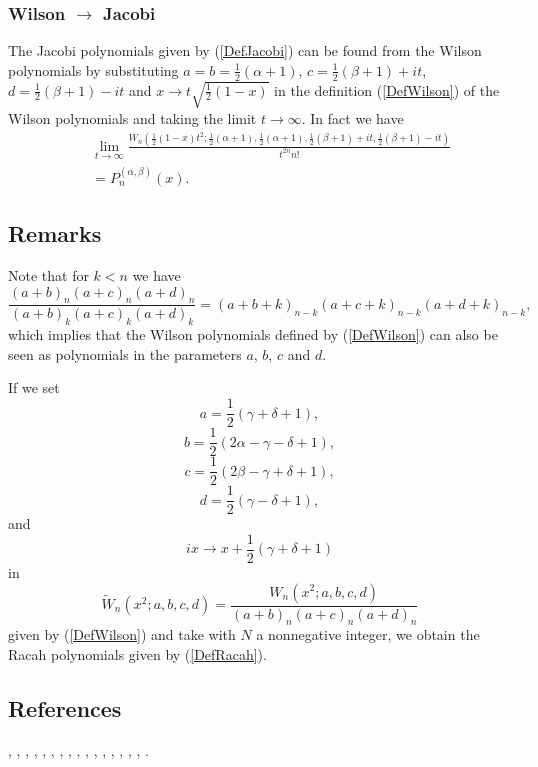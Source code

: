 \documentclass[envcountchap,graybox]{svmono}
\newcounter{rom}
\begin{document}
\subsubsection*{Wilson $\rightarrow$ Jacobi}
The Jacobi polynomials given by (\ref{DefJacobi}) can be found from the Wilson
polynomials by substituting $a=b=\frac{1}{2}(\alpha+1)$, $c=\frac{1}{2}(\beta+1)+it$,
$d=\frac{1}{2}(\beta+1)-it$ and $x\rightarrow t\sqrt{\frac{1}{2}(1-x)}$ in the
definition (\ref{DefWilson}) of the Wilson polynomials and taking the limit
$t\rightarrow\infty$. In fact we have
\begin{eqnarray}
& &\lim_{t\rightarrow\infty}\frac{W_n(\frac{1}{2}(1-x)t^2;\frac{1}{2}(\alpha+1),
\frac{1}{2}(\alpha+1),\frac{1}{2}(\beta+1)+it,\frac{1}{2}(\beta+1)-it)}{t^{2n}n!}\nonumber\\
& &{}=P_n^{(\alpha,\beta)}(x).
\end{eqnarray}

\subsection*{Remarks}
Note that for $k<n$ we have
$$\frac{(a+b)_n(a+c)_n(a+d)_n}{(a+b)_k(a+c)_k(a+d)_k}=(a+b+k)_{n-k}(a+c+k)_{n-k}(a+d+k)_{n-k},$$
which implies that the Wilson polynomials defined by (\ref{DefWilson}) can also be
seen as polynomials in the parameters $a$, $b$, $c$ and $d$.

\noindent
If we set
$$a=\textstyle\frac{1}{2}(\gamma+\delta+1),$$
$$b=\textstyle\frac{1}{2}(2\alpha-\gamma-\delta+1),$$
$$c=\textstyle\frac{1}{2}(2\beta-\gamma+\delta+1),$$
$$d=\textstyle\frac{1}{2}(\gamma-\delta+1),$$
and
$$ix\rightarrow x+\textstyle\frac{1}{2}(\gamma+\delta+1)$$
in
\begin{equation}
{\tilde{W}}_n(x^2;a,b,c,d)=\frac{W_n(x^2;a,b,c,d)}{(a+b)_n(a+c)_n(a+d)_n}
\end{equation}
given by (\ref{DefWilson}) and take
with $N$ a nonnegative integer, we obtain the Racah polynomials given by (\ref{DefRacah}).

\subsection*{References}
\cite{Askey89I}, \cite{AskeyWilson82}, \cite{AskeyWilson85}, \cite{AtakRahmanSuslov},
\cite{Ismail2005II}, \cite{IsmailLetMasVal}, \cite{IsmailLetValWimp90},
\cite{IsmailLetValWimp91}, \cite{Koorn85}, \cite{Koorn88}, \cite{LeskyWaibel},
\cite{Masson91}, \cite{Miller87}, \cite{MimachiII}, \cite{ValentAssche}, \cite{Wilson80}, 
\cite{Wilson91}.
\end{document}
